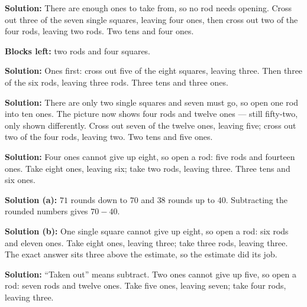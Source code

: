 \documentclass[12pt]{article}
\begin{document}




\textbf{Solution:} There are enough ones to take from, so no rod needs opening. Cross out three of the seven single squares, leaving four ones, then cross out two of the four rods, leaving two rods. Two tens and four ones. 

\textbf{Blocks left:} two rods and four squares.


\textbf{Solution:} Ones first: cross out five of the eight squares, leaving three. Then three of the six rods, leaving three rods. Three tens and three ones. 


\textbf{Solution:} There are only two single squares and seven must go, so open one rod into ten ones. The picture now shows four rods and twelve ones --- still fifty-two, only shown differently. Cross out seven of the twelve ones, leaving five; cross out two of the four rods, leaving two. Two tens and five ones. 


\textbf{Solution:} Four ones cannot give up eight, so open a rod: five rods and fourteen ones. Take eight ones, leaving six; take two rods, leaving three. Three tens and six ones. 


\textbf{Solution (a):} $71$ rounds down to $70$ and $38$ rounds up to $40$. Subtracting the rounded numbers gives $70 - 40$. 

\textbf{Solution (b):} One single square cannot give up eight, so open a rod: six rods and eleven ones. Take eight ones, leaving three; take three rods, leaving three. The exact answer sits three above the estimate, so the estimate did its job. 


\textbf{Solution:} ``Taken out'' means subtract. Two ones cannot give up five, so open a rod: seven rods and twelve ones. Take five ones, leaving seven; take four rods, leaving three. 
\end{document}
